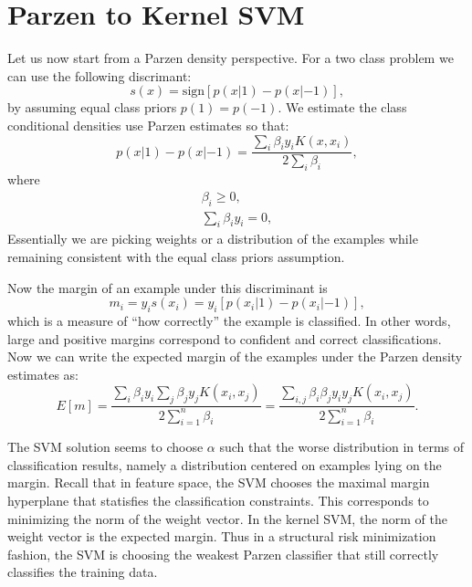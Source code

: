 \documentclass{article}
\begin{document}
\section{Parzen to Kernel SVM}
Let us now start from a Parzen density perspective.  For a two class problem we can use the following discrimant:
\begin{equation}
s(x) = \text{sign}[p(x|1) - p(x|-1)],
\end{equation}
by assuming equal class priors $p(1)=p(-1)$.
We estimate the class conditional densities use Parzen estimates so that:
\begin{equation}
p(x|1) - p(x|-1) = \frac{\sum_i \beta_i y_i K(x,x_i)}{2\sum_i \beta_i},
\end{equation}
where
\begin{align}
\beta_i \ge 0, \\
\sum_i \beta_i y_i = 0,
\end{align}
Essentially we are picking weights or a distribution of the examples while remaining consistent with the equal class priors assumption.

Now the margin of an example under this discriminant is
\begin{equation}
m_i = y_i s(x_i) = y_i [p(x_i|1)-p(x_i|-1)],
\end{equation}
which is a measure of ``how correctly'' the example is classified.  In other words, large and positive margins correspond to confident and correct classifications.  Now we can write the expected margin of the examples under the Parzen density estimates as:
\begin{equation}
E[m] = \frac{\sum_i \beta_i y_i \sum_j \beta_j y_j K(x_i,x_j)}{2\sum_{i=1}^n \beta_i} = \frac{\sum_{i,j} \beta_i \beta_j y_i y_j K(x_i,x_j)}{2\sum_{i=1}^n \beta_i}.
\end{equation}

The SVM solution seems to choose $\alpha$ such that the worse distribution in terms of classification results, namely a distribution centered on examples lying on the margin.  Recall that in feature space, the SVM chooses the maximal margin hyperplane that statisfies the classification constraints.  This corresponds to minimizing the norm of the weight vector.  In the kernel SVM, the norm of the weight vector is the expected margin.  Thus in a structural risk minimization fashion, the SVM is choosing the weakest Parzen classifier that still correctly classifies the training data.

\nocite{vapnik98}



\end{document}
